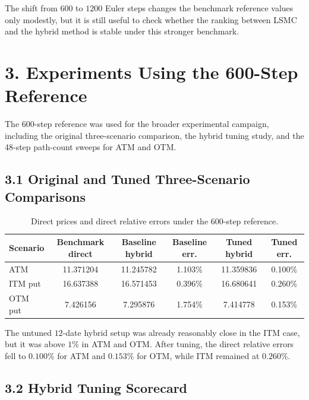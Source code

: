 \documentclass[11pt,a4paper]{article}
\begin{document}
The shift from \(600\) to \(1200\) Euler steps changes the benchmark reference values only modestly, but it is still useful to check whether the ranking between LSMC and the hybrid method is stable under this stronger benchmark.

\section*{3. Experiments Using the 600-Step Reference}

The \(600\)-step reference was used for the broader experimental campaign, including the original three-scenario comparison, the hybrid tuning study, and the 48-step path-count sweeps for ATM and OTM.

\subsection*{3.1 Original and Tuned Three-Scenario Comparisons}

\begin{table}[h!]
\centering
\caption{Direct prices and direct relative errors under the 600-step reference.}
\begin{tabular}{lccccc}
\toprule
Scenario & Benchmark direct & Baseline hybrid & Baseline err. & Tuned hybrid & Tuned err. \\
\midrule
ATM & 11.371204 & 11.245782 & 1.103\% & 11.359836 & 0.100\% \\
ITM put & 16.637388 & 16.571453 & 0.396\% & 16.680641 & 0.260\% \\
OTM put & 7.426156 & 7.295876 & 1.754\% & 7.414778 & 0.153\% \\
\bottomrule
\end{tabular}
\end{table}

The untuned \(12\)-date hybrid setup was already reasonably close in the ITM case, but it was above \(1\%\) in ATM and OTM. After tuning, the direct relative errors fell to \(0.100\%\) for ATM and \(0.153\%\) for OTM, while ITM remained at \(0.260\%\).

\subsection*{3.2 Hybrid Tuning Scorecard}
\end{document}
